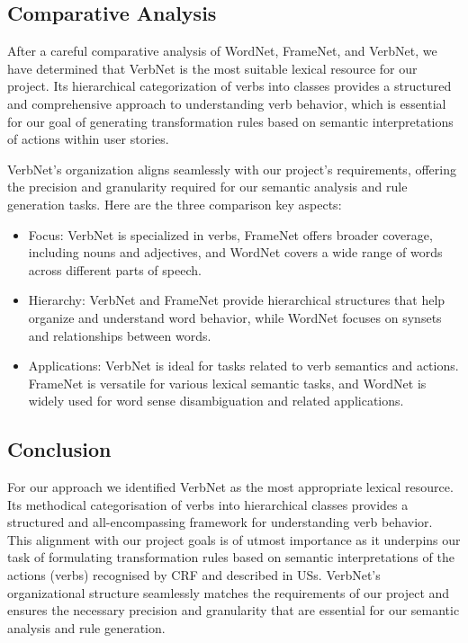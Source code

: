 \subsection{Comparative Analysis} \label{sec_5_campare}
After a careful comparative analysis of WordNet, FrameNet, and VerbNet, we have determined that VerbNet is the most suitable lexical resource for our project. Its hierarchical categorization of verbs into classes provides a structured and comprehensive approach to understanding verb behavior, which is essential for our goal of generating transformation rules based on semantic interpretations of actions within user stories. 

VerbNet's organization aligns seamlessly with our project's requirements, offering the precision and granularity required for our semantic analysis and rule generation tasks.
Here are the three comparison key aspects:
\begin{itemize}
\item Focus: VerbNet is specialized in verbs, FrameNet offers broader coverage, including nouns and adjectives, and WordNet covers a wide range of words across different parts of speech.
\item Hierarchy: VerbNet and FrameNet provide hierarchical structures that help organize and understand word behavior, while WordNet focuses on synsets and relationships between words.
\item Applications: VerbNet is ideal for tasks related to verb semantics and actions. FrameNet is versatile for various lexical semantic tasks, and WordNet is widely used for word sense disambiguation and related applications.
\end{itemize}
\subsection{Conclusion}\label{nlp_bottom_line}
For our approach we identified VerbNet as the most appropriate lexical resource. Its methodical categorisation of verbs into hierarchical classes provides a structured and all-encompassing framework for understanding verb behavior. This alignment with our project goals is of utmost importance as it underpins our task of formulating transformation rules based on semantic interpretations of the actions (verbs) recognised by CRF and described in USs. VerbNet's organizational structure seamlessly matches the requirements of our project and ensures the necessary precision and granularity that are essential for our semantic analysis and rule generation.

